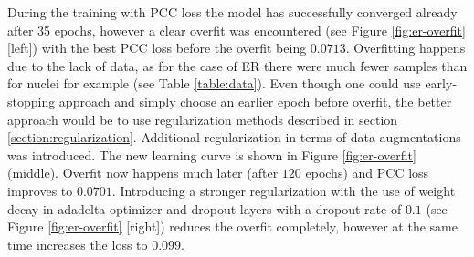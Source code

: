 During the training with PCC loss the model has successfully converged already after 35 epochs, however a clear overfit was encountered (see Figure \ref{fig:er-overfit} [left]) with the best PCC loss before the overfit being $0.0713$. Overfitting happens due to the lack of data, as for the case of ER there were much fewer samples than for nuclei for example (see Table \ref{table:data}). Even though one could use early-stopping approach and simply choose an earlier epoch before overfit, the better approach would be to use regularization methods described in section \ref{section:regularization}. Additional regularization in terms of data augmentations was introduced. The new learning curve is shown in Figure \ref{fig:er-overfit} (middle). Overfit now happens much later (after $120$ epochs) and PCC loss improves to $0.0701$. Introducing a stronger regularization with the use of weight decay in adadelta optimizer and dropout layers with a dropout rate of $0.1$ (see Figure \ref{fig:er-overfit} [right]) reduces the overfit completely, however at the same time increases the loss to $0.099$.

